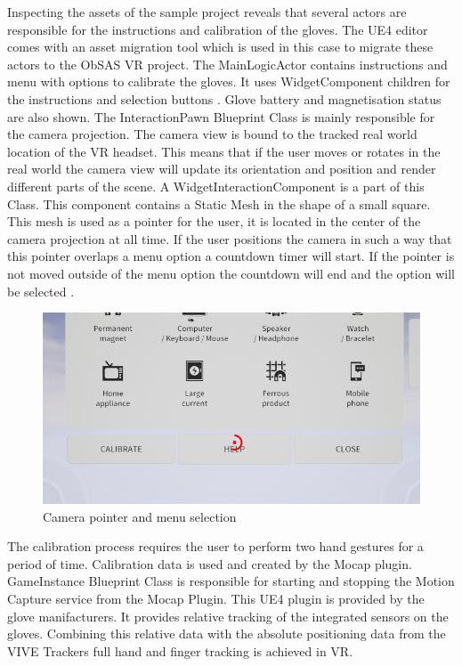 \documentclass[12pt, a4paper,oneside, nocenter]{thesis}
\begin{document}
Inspecting the assets of the sample project reveals that several actors are responsible for the instructions and calibration of the gloves. The UE4 editor comes with an asset migration tool which is used in this case to migrate these actors to the ObSAS VR project. The MainLogicActor contains instructions and menu with options to calibrate the gloves. It uses WidgetComponent children for the instructions and selection buttons . Glove battery and magnetisation status are also shown. The InteractionPawn Blueprint Class is mainly responsible for the camera projection. The camera view is bound to the tracked real world location of the VR headset. This means that if the user moves or rotates in the real world the camera view will update its orientation and position and render different parts of the scene. A WidgetInteractionComponent is a part of this Class. This component contains a Static Mesh in the shape of a small square. This mesh is used as a pointer for the user, it is located in the center of the camera projection at all time. If the user positions the camera in such a way that this pointer overlaps a menu option a countdown timer will start. If the pointer is not moved outside of the menu option the countdown will end and the option will be selected .
\begin{figure}[H]
	\includegraphics[width=\textwidth]{menu-selection}
	\caption{Camera pointer and menu selection}
	\label{fig:menu-selection}
\end{figure}
The calibration process requires the user to perform two hand gestures for a period of time. Calibration data is used and created by the Mocap plugin. GameInstance Blueprint Class is responsible for starting and stopping the Motion Capture service from the Mocap Plugin. This UE4 plugin is provided by the glove manifacturers. It provides relative tracking of the integrated sensors on the gloves. Combining this relative data with the absolute positioning data from the VIVE Trackers full hand and finger tracking is achieved in VR.
\end{document}
